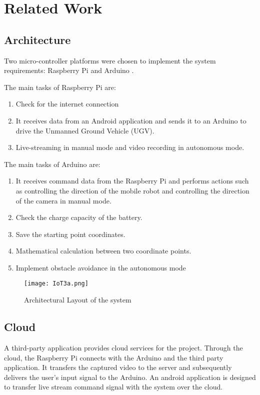\documentclass[conference,a4paper]{IEEEtran}
\begin{document}
\section{Related Work}
\subsection{Architecture}
Two micro-controller platforms were chosen to implement the system requirements: Raspberry Pi and Arduino \cite{11}.

The main tasks of Raspberry Pi are:
\begin{enumerate}
  \item Check for the internet connection
  \item It receives data from an Android application and sends it to an Arduino to drive the Unmanned Ground Vehicle (UGV).
  \item Live-streaming in  manual mode and video recording  in  autonomous mode.
\end{enumerate}

The main tasks of Arduino are: 
\begin{enumerate}
    \item It receives command data from the Raspberry Pi and performs actions such as controlling the direction of the mobile robot and controlling the direction of the camera  in manual mode.
    \item Check the  charge capacity of the battery.
    \item Save the starting point coordinates.
    \item Mathematical calculation between two coordinate points.
    \item Implement obstacle avoidance in the autonomous mode 
\end{enumerate}

\begin{figure*}[ht]
\centering
\texttt{[image: IoT3a.png]}
\caption{Architectural Layout of the system}
\label{Fig: IoT5}
\end{figure*}

\subsection{Cloud}
A third-party application provides cloud services for the project. Through the cloud, the Raspberry Pi connects with the Arduino and the third party application. It transfers the captured video to the server and subsequently delivers the user's input signal to the Arduino. An android application is designed to transfer live stream command signal with the system over the cloud. \cite{7}
\end{document}
